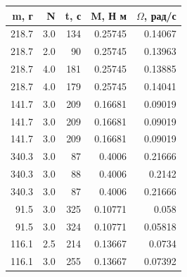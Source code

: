 \begin{tabular}{rrrrr}
\toprule
m, г & N & t, с & M, Н м & $\Omega$, рад/с \\
\midrule
218.7 & 3.0 & 134 & 0.25745 & 0.14067 \\
218.7 & 2.0 & 90 & 0.25745 & 0.13963 \\
218.7 & 4.0 & 181 & 0.25745 & 0.13885 \\
218.7 & 4.0 & 179 & 0.25745 & 0.14041 \\
141.7 & 3.0 & 209 & 0.16681 & 0.09019 \\
141.7 & 3.0 & 209 & 0.16681 & 0.09019 \\
141.7 & 3.0 & 209 & 0.16681 & 0.09019 \\
340.3 & 3.0 & 87 & 0.4006 & 0.21666 \\
340.3 & 3.0 & 88 & 0.4006 & 0.2142 \\
340.3 & 3.0 & 87 & 0.4006 & 0.21666 \\
91.5 & 3.0 & 325 & 0.10771 & 0.058 \\
91.5 & 3.0 & 324 & 0.10771 & 0.05818 \\
116.1 & 2.5 & 214 & 0.13667 & 0.0734 \\
116.1 & 3.0 & 255 & 0.13667 & 0.07392 \\
\bottomrule
\end{tabular}
